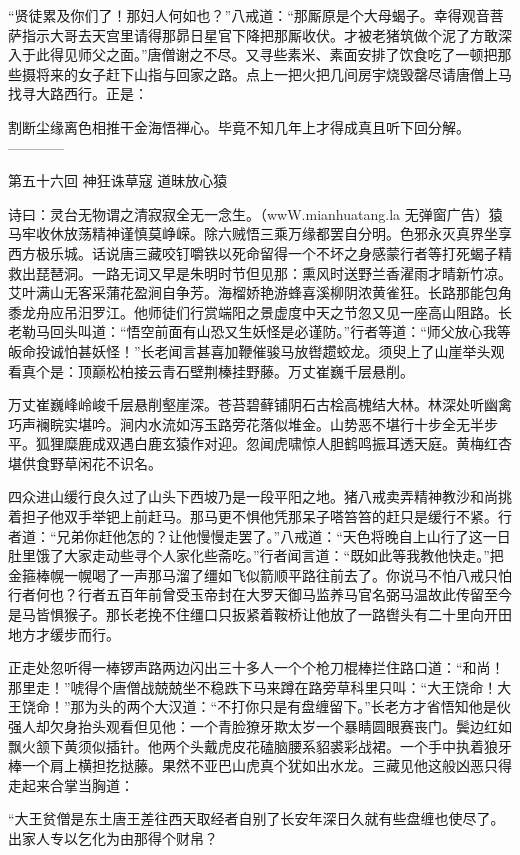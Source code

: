 \documentclass[12pt,UTF8]{ctexbook}
\begin{document}
“贤徒累及你们了！那妇人何如也？”八戒道：“那厮原是个大母蝎子。幸得观音菩萨指示大哥去天宫里请得那昴日星官下降把那厮收伏。才被老猪筑做个泥了方敢深入于此得见师父之面。”唐僧谢之不尽。又寻些素米、素面安排了饮食吃了一顿把那些摄将来的女子赶下山指与回家之路。点上一把火把几间房宇烧毁罄尽请唐僧上马找寻大路西行。正是：

割断尘缘离色相推干金海悟禅心。毕竟不知几年上才得成真且听下回分解。
------------

第五十六回 神狂诛草寇 道昧放心猿

诗曰：灵台无物谓之清寂寂全无一念生。（wwW.mianhuatang.la 无弹窗广告）猿马牢收休放荡精神谨慎莫峥嵘。除六贼悟三乘万缘都罢自分明。色邪永灭真界坐享西方极乐城。话说唐三藏咬钉嚼铁以死命留得一个不坏之身感蒙行者等打死蝎子精救出琵琶洞。一路无词又早是朱明时节但见那：熏风时送野兰香濯雨才晴新竹凉。艾叶满山无客采蒲花盈涧自争芳。海榴娇艳游蜂喜溪柳阴浓黄雀狂。长路那能包角黍龙舟应吊汨罗江。他师徒们行赏端阳之景虚度中天之节忽又见一座高山阻路。长老勒马回头叫道：“悟空前面有山恐又生妖怪是必谨防。”行者等道：“师父放心我等皈命投诚怕甚妖怪！”长老闻言甚喜加鞭催骏马放辔趱蛟龙。须臾上了山崖举头观看真个是：顶巅松柏接云青石壁荆榛挂野藤。万丈崔巍千层悬削。

万丈崔巍峰岭峻千层悬削壑崖深。苍苔碧藓铺阴石古桧高槐结大林。林深处听幽禽巧声襕睆实堪吟。涧内水流如泻玉路旁花落似堆金。山势恶不堪行十步全无半步平。狐狸糜鹿成双遇白鹿玄猿作对迎。忽闻虎啸惊人胆鹤鸣振耳透天庭。黄梅红杏堪供食野草闲花不识名。

四众进山缓行良久过了山头下西坡乃是一段平阳之地。猪八戒卖弄精神教沙和尚挑着担子他双手举钯上前赶马。那马更不惧他凭那呆子嗒笞笞的赶只是缓行不紧。行者道：“兄弟你赶他怎的？让他慢慢走罢了。”八戒道：“天色将晚自上山行了这一日肚里饿了大家走动些寻个人家化些斋吃。”行者闻言道：“既如此等我教他快走。”把金箍棒幌一幌喝了一声那马溜了缰如飞似箭顺平路往前去了。你说马不怕八戒只怕行者何也？行者五百年前曾受玉帝封在大罗天御马监养马官名弼马温故此传留至今是马皆惧猴子。那长老挽不住缰口只扳紧着鞍桥让他放了一路辔头有二十里向开田地方才缓步而行。

正走处忽听得一棒锣声路两边闪出三十多人一个个枪刀棍棒拦住路口道：“和尚！那里走！”唬得个唐僧战兢兢坐不稳跌下马来蹲在路旁草科里只叫：“大王饶命！大王饶命！”那为头的两个大汉道：“不打你只是有盘缠留下。”长老方才省悟知他是伙强人却欠身抬头观看但见他：一个青脸獠牙欺太岁一个暴睛圆眼赛丧门。鬓边红如飘火颔下黄须似插针。他两个头戴虎皮花磕脑腰系貂裘彩战裙。一个手中执着狼牙棒一个肩上横担扢挞藤。果然不亚巴山虎真个犹如出水龙。三藏见他这般凶恶只得走起来合掌当胸道：

“大王贫僧是东土唐王差往西天取经者自别了长安年深日久就有些盘缠也使尽了。出家人专以乞化为由那得个财帛？
\end{document}
